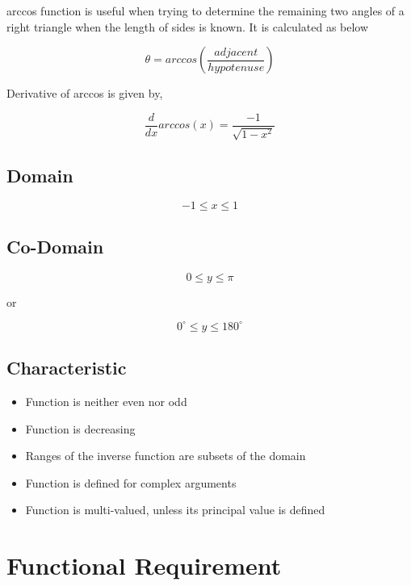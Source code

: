 \documentclass[12pt]{report}
\begin{document}
arccos function is useful when trying to determine the remaining two angles of a right triangle when the length of sides is known. It is calculated as below

$$\theta = arccos( \frac{adjacent}{hypotenuse})$$

Derivative of arccos is given by,

$$ \frac{d}{dx} arccos(x) = \frac{-1}{\sqrt{1-x^2}} $$

\subsection{Domain}
  $$−1 \leq x \leq 1 $$
\subsection{Co-Domain}  
$$0 \leq y \leq \pi  $$ 
\begin{center}
 or   
\end{center}
$$0^\circ\leq y \leq 180^\circ $$

\subsection{Characteristic}
\begin{itemize}
    \item Function is neither even nor odd
    \item Function is decreasing
    \item Ranges of the inverse function are subsets of the domain
    \item Function is defined for complex arguments
    \item Function is multi-valued, unless its principal value is defined
\end{itemize}

\newpage
\section{Functional Requirement}
\end{document}
